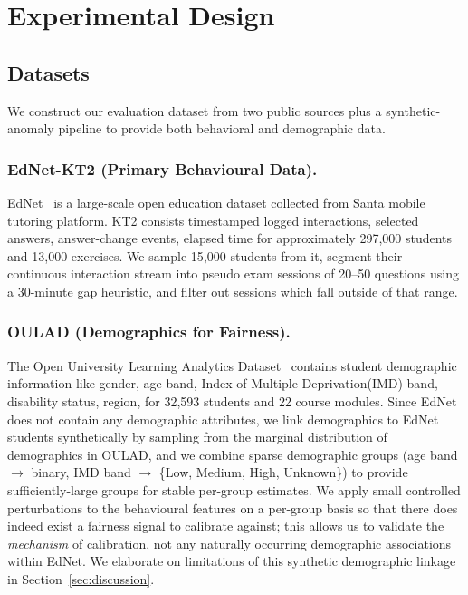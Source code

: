 \documentclass[sigconf]{acmart}
\begin{document}
\section{Experimental Design}
\label{sec:experimental}

\subsection{Datasets}
\label{subsec:datasets}

We construct our evaluation dataset from two public sources plus a synthetic-anomaly pipeline to provide both behavioral and demographic data.

\subsubsection{EdNet-KT2 (Primary Behavioural Data).}
EdNet~\cite{choi2020ednet} is a large-scale open education dataset collected from Santa mobile tutoring platform. KT2 consists timestamped logged interactions, selected answers, answer-change events, elapsed time for approximately 297{,}000 students and 13{,}000 exercises. We sample 15{,}000 students from it, segment their continuous interaction stream into pseudo exam sessions of 20--50 questions using a 30-minute gap heuristic, and filter out sessions which fall outside of that range.

\subsubsection{OULAD (Demographics for Fairness).}
The Open University Learning Analytics Dataset~\cite{open_university_learning_analytics_dataset_349} contains student demographic information like gender, age band, Index of Multiple Deprivation(IMD) band, disability status, region, for 32{,}593 students and 22 course modules. Since EdNet does not contain any demographic attributes, we link demographics to EdNet students synthetically by sampling from the marginal distribution of demographics in OULAD, and we combine sparse demographic groups (age band $\rightarrow$ binary, IMD band $\rightarrow$ \{Low, Medium, High, Unknown\}) to provide sufficiently-large groups for stable per-group estimates. We apply small controlled perturbations to the behavioural features on a per-group basis so that there does indeed exist a fairness signal to calibrate against; this allows us to validate the \emph{mechanism} of calibration, not any naturally occurring demographic associations within EdNet. We elaborate on limitations of this synthetic demographic linkage in Section~\ref{sec:discussion}.
\end{document}

